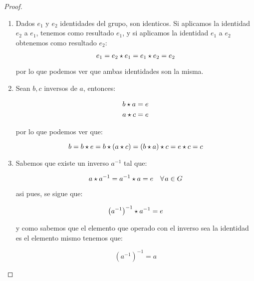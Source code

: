         \begin{proof}\mbox{}\\
            \begin{enumerate}
                \item Dados $e_1$ y $e_2$ identidades del grupo, son identicos.
                Si aplicamos la identidad $e_2$ a $e_1$, tenemos como resultado $e_1$, y si aplicamos la identidad $e_1$ a $e_2$ obtenemos como resultado $e_2$:

                \begin{equation*}
                    e_1 = e_2 \star e_1 = e_1 \star e_2 = e_2
                \end{equation*}

                por lo que podemos ver que ambas identidades son la misma.

                \item Sean $b, c$ inversos de $a$, entonces:

                \begin{align*}
                    b \star a &= e \\
                    a \star c &= e
                \end{align*}

                por lo que podemos ver que:

                \begin{equation*}
                    b = b \star e = b \star (a \star c) = (b \star a) \star c = e \star c = c
                \end{equation*}

                \item Sabemos que existe un inverso $a^{-1}$ tal que:

                \begin{equation*}
                    a \star a^{-1} = a^{-1} \star a = e \quad \forall \mkern2mu a \in G
                \end{equation*}

                asi pues, se sigue que:

                \begin{equation*}
                    \left( a^{-1} \right)^{-1} \star a^{-1} = e
                \end{equation*}

                y como sabemos que el elemento que operado con el inverso sea la identidad es el elemento mismo tenemos que:

                \begin{equation*}
                    \left( a^{-1} \right)^{-1} = a
                \end{equation*}


\end{enumerate}
\end{proof}
